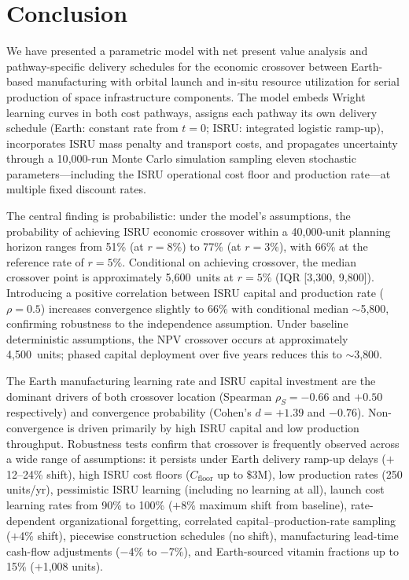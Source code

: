 \documentclass[preprint,12pt]{elsarticle}
\begin{document}
\section{Conclusion}
\label{sec:conclusion}

We have presented a parametric model with net present value analysis and pathway-specific delivery schedules for the economic crossover between Earth-based manufacturing with orbital launch and in-situ resource utilization for serial production of space infrastructure components. The model embeds Wright learning curves in both cost pathways, assigns each pathway its own delivery schedule (Earth: constant rate from $t = 0$; ISRU: integrated logistic ramp-up), incorporates ISRU mass penalty and transport costs, and propagates uncertainty through a 10{,}000-run Monte Carlo simulation sampling eleven stochastic parameters---including the ISRU operational cost floor and production rate---at multiple fixed discount rates.

The central finding is probabilistic: under the model's assumptions, the probability of achieving ISRU economic crossover within a 40{,}000-unit planning horizon ranges from 51\% (at $r = 8\%$) to 77\% (at $r = 3\%$), with 66\% at the reference rate of $r = 5\%$. Conditional on achieving crossover, the median crossover point is approximately 5{,}600~units at $r = 5\%$ (IQR [3{,}300, 9{,}800]). Introducing a positive correlation between ISRU capital and production rate ($\rho = 0.5$) increases convergence slightly to 66\% with conditional median $\sim$5{,}800, confirming robustness to the independence assumption. Under baseline deterministic assumptions, the NPV crossover occurs at approximately 4{,}500~units; phased capital deployment over five years reduces this to $\sim$3{,}800.

The Earth manufacturing learning rate and ISRU capital investment are the dominant drivers of both crossover location (Spearman $\rho_S = -0.66$ and $+0.50$ respectively) and convergence probability (Cohen's $d = +1.39$ and $-0.76$). Non-convergence is driven primarily by high ISRU capital and low production throughput. Robustness tests confirm that crossover is frequently observed across a wide range of assumptions: it persists under Earth delivery ramp-up delays ($+$12--24\% shift), high ISRU cost floors ($C_{\mathrm{floor}}$ up to \$3M), low production rates (250 units/yr), pessimistic ISRU learning (including no learning at all), launch cost learning rates from 90\% to 100\% ($+$8\% maximum shift from baseline), rate-dependent organizational forgetting, correlated capital--production-rate sampling ($+$4\% shift), piecewise construction schedules (no shift), manufacturing lead-time cash-flow adjustments ($-$4\% to $-$7\%), and Earth-sourced vitamin fractions up to 15\% ($+$1{,}008 units).
\end{document}
